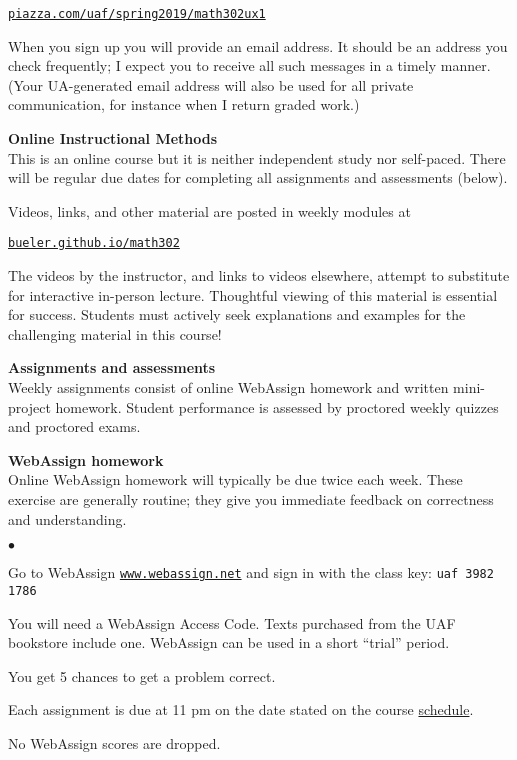 \documentclass[12pt]{article}
\renewcommand{\emph}[1]{\textsf{\textbf{#1}}}
\newcommand{\localhead}[1]{\par\smallskip\textbf{#1}\nobreak\\}%
\def\heading#1{\localhead{\large\emph{#1}}}
\def\subheading#1{\localhead{\emph{#1}}}
\newenvironment{clist}%
{\bgroup\parskip 0pt\begin{list}{$\bullet$}{\partopsep 4pt\topsep 0pt\itemsep -2pt}}%
{\end{list}\egroup}%
\begin{document}
\smallskip
\centerline{\href{https://piazza.com/uaf/spring2019/math302ux1}{\tt piazza.com/uaf/spring2019/math302ux1}}

When you sign up you will provide an email address.  It should be an address you check frequently; I expect you to receive all such messages in a timely manner.  (Your UA-generated email address will also be used for all private communication, for instance when I return graded work.)


\newpage
\strut

\heading{Online Instructional Methods}
This is an online course but it is neither independent study nor self-paced.  There will be regular due dates for completing all assignments and assessments (below).

Videos, links, and other material are posted in weekly modules at

\smallskip
\centerline{\href{https://bueler.github.io/math302/}{\tt bueler.github.io/math302}}

The videos by the instructor, and links to videos elsewhere, attempt to substitute for interactive in-person lecture.  Thoughtful viewing of this material is essential for success.  Students must actively seek explanations and examples for the challenging material in this course!


\heading{Assignments and assessments}
Weekly assignments consist of online WebAssign homework and written mini-project homework.  Student performance is assessed by proctored weekly quizzes and proctored exams.

\subheading{WebAssign homework} 
Online WebAssign homework will typically be due twice each week.  These exercise are generally routine; they give you immediate feedback on correctness and understanding.

\begin{clist}
\item Go to WebAssign \href{https://www.webassign.net/}{\tt www.webassign.net} and sign in with the class key: \quad \texttt{uaf 3982 1786}
\item You will need a WebAssign Access Code.  Texts purchased from the UAF bookstore include one.  WebAssign can be used in a short ``trial'' period.
\item You get 5 chances to get a problem correct. 
\item Each assignment is due at 11 pm on the date stated on the course \href{https://bueler.github.io/math302/schedule.pdf}{schedule}. 
\item No WebAssign scores are dropped.
\end{clist}
\end{document}
